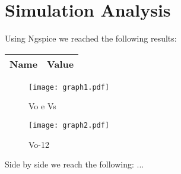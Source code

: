 \section{Simulation Analysis}
\label{sec:simulation}

Using Ngspice we reached the following results:

\begin{table}[H]
  \centering
  \begin{tabular}{|l|r|}
    \hline    
    {\bf Name} & {\bf Value} \\ \hline
    
  \end{tabular}
  \label{tab:op}
\end{table}

\begin{figure}[H] \centering
  \texttt{[image: graph1.pdf]}
  \caption{ Vo e Vs }
  \label{fig:sim1}
  \end{figure}

  \begin{figure}[H] \centering
    \texttt{[image: graph2.pdf]}
    \caption{ Vo-12 }
    \label{fig:sim2}
    \end{figure}

    Side by side we reach the following:
    ...


